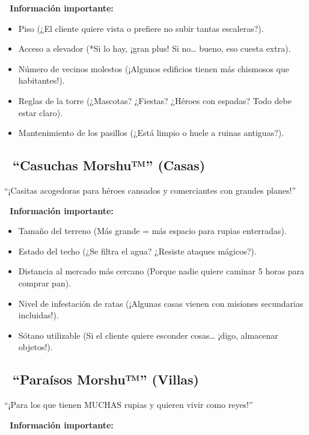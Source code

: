 \documentclass[
  letterpaper,
  DIV=11,
  numbers=noendperiod]{scrreprt}
\providecommand{\tightlist}{%
  \setlength{\itemsep}{0pt}\setlength{\parskip}{0pt}}\usepackage{longtable,booktabs,array}
\begin{document}
\textbf{📜 Información importante:}

\begin{itemize}
\tightlist
\item
  Piso (¿El cliente quiere vista o prefiere no subir tantas escaleras?).
\item
  Acceso a elevador (*Si lo hay, ¡gran plus! Si no\ldots{} bueno, eso
  cuesta extra).
\item
  Número de vecinos molestos (¡Algunos edificios tienen más chismosos
  que habitantes!).
\item
  Reglas de la torre (¿Mascotas? ¿Fiestas? ¿Héroes con espadas? Todo
  debe estar claro).
\item
  Mantenimiento de los pasillos (¿Está limpio o huele a ruinas
  antiguas?).
\end{itemize}

\subsection{🏡 ``Casuchas Morshu™'' (Casas)
🏡}\label{casuchas-morshu-casas}

``¡Casitas acogedoras para héroes cansados y comerciantes con grandes
planes!''

\textbf{📜 Información importante:}

\begin{itemize}
\tightlist
\item
  Tamaño del terreno (Más grande = más espacio para rupias enterradas).
\item
  Estado del techo (¿Se filtra el agua? ¿Resiste ataques mágicos?).
\item
  Distancia al mercado más cercano (Porque nadie quiere caminar 5 horas
  para comprar pan).
\item
  Nivel de infestación de ratas (¡Algunas casas vienen con misiones
  secundarias incluidas!).
\item
  Sótano utilizable (Si el cliente quiere esconder cosas\ldots{} ¡digo,
  almacenar objetos!).
\end{itemize}

\subsection{🌴 ``Paraísos Morshu™'' (Villas)
🌴}\label{parauxedsos-morshu-villas}

``¡Para los que tienen MUCHAS rupias y quieren vivir como reyes!''

\textbf{📜 Información importante:}
\end{document}
